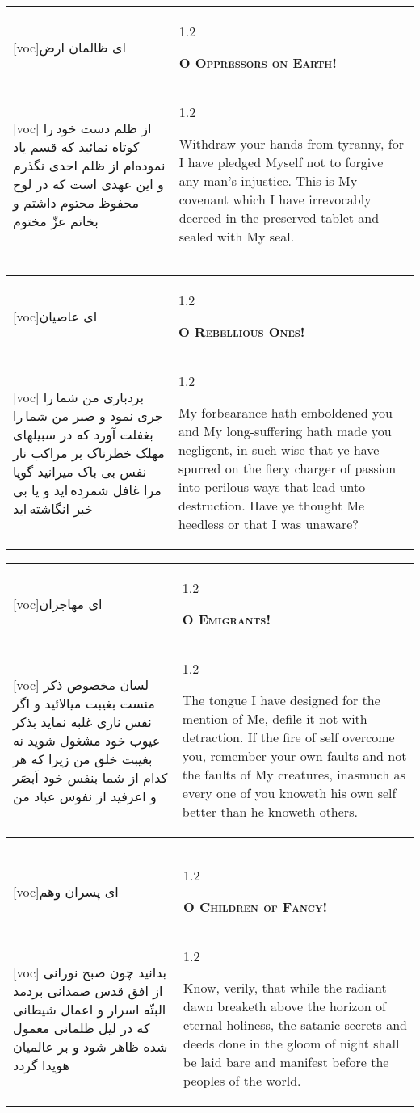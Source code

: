 \documentclass[11pt]{article}
\makeatletter
\newenvironment{orig}
  {\begin{farsi}[voc]}
  {\end{farsi}}
\newenvironment{trans}
  {\Large\begin{spacing}{1.2}\raggedright}
  {\end{spacing}}
\newenvironment{word}
  {\begin{tabular}[t]{p{2.75in}@{\hspace{3em}}p{2.75in}}}
  {\end{tabular}}
\newcommand{\ayat}[2]{\begin{orig}#1\end{orig} & \begin{trans}#2\end{trans}}
\newcommand{\heading}[2]{\textsc{\textbf{#1}} %
}
\makeatother
\begin{document}
\pagebreak

\begin{word}
\ayat{ای ظالمان ارض}{\heading{O Oppressors on Earth!}{}} \\ \ayat{
از ظلم دست خود را کوتاه نمائيد که قسم ياد نموده‌ام از ظلم احدی نگذرم و اين عهدی است که در لوح محفوظ محتوم داشتم و بخاتم عزّ مختوم
}{
  Withdraw your hands from tyranny, for I have pledged Myself not to forgive
  any man's injustice. This is My covenant which I have irrevocably decreed in
  the preserved tablet and sealed with My seal.
}
\end{word}

\pagebreak

\begin{word}
\ayat{ای عاصيان}{\heading{O Rebellious Ones!}{}} \\ \ayat{
بردباری من شما را جری نمود و صبر من شما را بغفلت آورد که در سبيلهای مهلک خطرناک بر مراکب نار نفس بی باک ميرانيد گويا مرا غافل شمرده ايد و يا بی خبر انگاشته ايد
}{
  My forbearance hath emboldened you and My long-suffering hath made you
  negligent, in such wise that ye have spurred on the fiery charger of passion
  into perilous ways that lead unto destruction. Have ye thought Me heedless
  or that I was unaware?
}
\end{word}

\pagebreak

\begin{word}
\ayat{ای مهاجران}{\heading{O Emigrants!}{}} \\ \ayat{
لسان مخصوص ذکر منست بغيبت ميالائيد و اگر نفس ناری غلبه نمايد بذکر عيوب خود مشغول شويد نه بغيبت خلق من زيرا که هر کدام از شما بنفس خود اَبصَر و اعرفيد از نفوس عباد من
}{
  The tongue I have designed for the mention of Me, defile it not with
  detraction. If the fire of self overcome you, remember your own faults and
  not the faults of My creatures, inasmuch as every one of you knoweth his own
  self better than he knoweth others.
}
\end{word}

\pagebreak

\begin{word}
\ayat{ای پسران وهم}{\heading{O Children of Fancy!}{}} \\ \ayat{
بدانيد چون صبح نورانی از افق قدس صمدانی بردمد البتّه اسرار و اعمال شيطانی که در ليل ظلمانی معمول شده ظاهر شود و بر عالميان هويدا گردد
}{
  Know, verily, that while the radiant dawn breaketh above the horizon of
  eternal holiness, the satanic secrets and deeds done in the gloom of night
  shall be laid bare and manifest before the peoples of the world.
}
\end{word}
\end{document}
